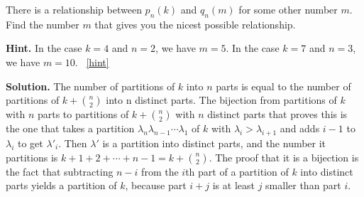 \documentclass{book}
\begin{document}
\setcounter{project}{312}
\addtocounter{project}{-1}
\begin{activity}[]\label{activity-305}
\hypertarget{p-1561}{}%
There is a relationship between \(p_n(k)\) and \(q_n(m)\) for some other number \(m\). Find the number \(m\) that gives you the nicest possible relationship.%
\par\smallskip%
\noindent\textbf{Hint.}\hypertarget{hint-200}{}\quad%
\hypertarget{p-1562}{}%
In the case \(k=4\) and \(n=2\), we have \(m=5\). In the case \(k = 7\) and \(n = 3\), we have \(m = 10\).%
~\hfill{\tiny\hyperlink{a-312}{[hint]}\hypertarget{q-312}{}}\par\smallskip%
\noindent\textbf{Solution.}\hypertarget{solution-205}{}\quad%
\hypertarget{p-1563}{}%
The number of partitions of \(k\) into \(n\) parts is equal to the number of partitions of \(k+\binom{n}{2}\) into n distinct parts.  The bijection from partitions of \(k\) with \(n\) parts to partitions of \(k+\binom{n}{2}\) with \(n\) distinct parts that proves this is the one that takes a partition \(\lambda_n\lambda_{n-1}\cdots\lambda_1\) of \(k\) with \(\lambda_i>\lambda_{i+1}\) and adds \(i-1\) to \(\lambda_i\) to get \(\lambda'_i\). Then \(\lambda'\) is a partition into distinct parts, and the number it partitions is \(k+1+2+\cdots+n-1=k+\binom{n}{2}\). The proof that it is a bijection is the fact that subtracting \(n-i\) from the \(i\)\/th part of a partition of \(k\) into distinct parts yields a partition of \(k\), because part \(i+j\) is at least \(j\) smaller than part \(i\).%
\end{activity}

\clearpage
\end{document}
